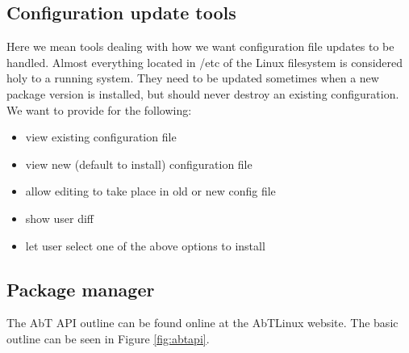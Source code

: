 \subsection{Configuration update tools}
Here we mean tools dealing with how we want configuration file updates to be handled. Almost everything located in /etc of the Linux filesystem is considered holy to a running system. They need to be updated sometimes when a new package version is installed, but should never destroy an existing configuration. We want to provide for the following:

\begin{itemize}
  \item view existing configuration file
  \item view new (default to install) configuration file
  \item allow editing to take place in old or new config file
  \item show user diff
  \item let user select one of the above options to install
\end{itemize}


\subsection{Package manager}
The AbT API outline can be found online at the AbTLinux website. The basic outline can be seen in Figure \ref{fig:abtapi}.


